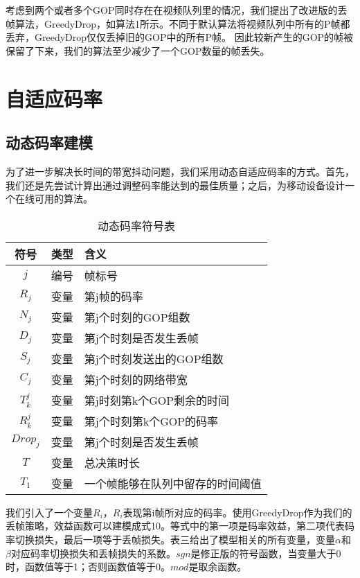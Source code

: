 考虑到两个或者多个GOP同时存在在视频队列里的情况，我们提出了改进版的丢帧算法，GreedyDrop，如算法1所示。不同于默认算法将视频队列中所有的P帧都丢弃，GreedyDrop仅仅丢掉旧的GOP中的所有P帧。 因此较新产生的GOP的帧被保留了下来，我们的算法至少减少了一个GOP数量的帧丢失。

\section{自适应码率}
\subsection{动态码率建模}
为了进一步解决长时间的带宽抖动问题，我们采用动态自适应码率的方式。首先，我们还是先尝试计算出通过调整码率能达到的最佳质量；之后，为移动设备设计一个在线可用的算法。

\begin{table}[tb]
\centering
\caption{动态码率符号表}
\label{vbr_vbr}
{\setlength{\tabcolsep}{1pt}
\begin{tabular}{|c|c|l|}
\hline
\textbf{符号} & \textbf{类型} & \textbf{含义}                      \\ \hline
$j$               & 编号         & 帧标号                            \\ \hline
$R_j$             & 变量      & 第j帧的码率 \\ \hline
$N_j$             & 变量      & 第j个时刻的GOP组数     \\ \hline
$D_j$             & 变量      & 第j个时刻是否发生丢帧  \\ \hline
$S_j$             & 变量   & 第j个时刻发送出的GOP组数 \\ \hline
$C_j$              & 变量         & 第j个时刻的网络带宽           \\ \hline
$T_k^j$               & 变量         & 第j时刻第k个GOP剩余的时间  \\ \hline
$R_k^j$            & 变量         & 第j个时刻第k个GOP的码率  \\ \hline
$Drop_j$       & 变量 & 第j个时刻是否发生丢帧 \\ \hline
$T$               & 变量         & 总决策时长                       \\ \hline
$T_1$               &变量          & 一个帧能够在队列中留存的时间阈值 \\
\hline\end{tabular}}
\end{table}

我们引入了一个变量$R_i$，$R_i$表现第i帧所对应的码率。使用GreedyDrop作为我们的丢帧策略，效益函数可以建模成式10。等式中的第一项是码率效益，第二项代表码率切换损失，最后一项等于丢帧损失。表三给出了模型相关的所有变量，变量$\alpha$和$\beta$对应码率切换损失和丢帧损失的系数。$sgn$是修正版的符号函数，当变量大于0时，函数值等于1；否则函数值等于0。$mod$是取余函数。

